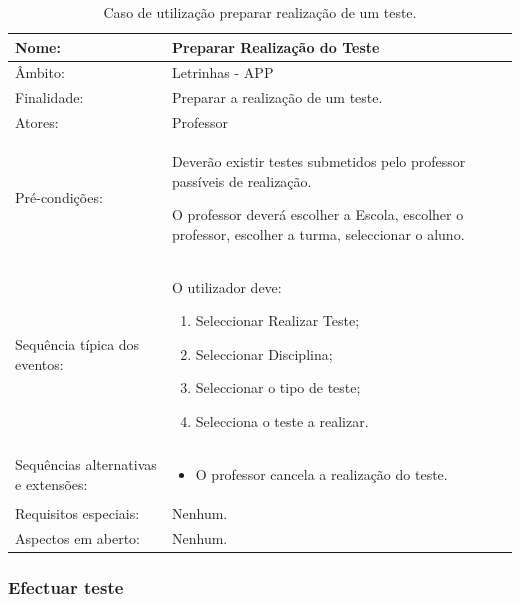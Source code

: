 \documentclass[a4paper]{article}
\begin{document}
					\begin{table}[h]
							\begin{tabular}{|p{2cm} p{10cm}|}
								\hline Nome: & Preparar Realização do Teste \\ 
								\hline Âmbito: & Letrinhas - APP \\ 
								\hline Finalidade: & Preparar a realização de um teste. \\ 
								\hline Atores: & Professor \\ 
							    \hline Pré-condições: & Deverão existir testes submetidos pelo  professor passíveis de realização.

								O professor deverá escolher a  Escola, escolher o professor, escolher a turma, seleccionar o aluno.
								 \\ 
							    \hline Sequência típica dos eventos: &  					
								O utilizador deve:
	    					\begin{enumerate}
							    \item	Seleccionar Realizar Teste;
								\item	Seleccionar Disciplina;
								\item	Seleccionar o tipo de teste;
								\item	Selecciona o teste a realizar.
						    \end{enumerate}  \\
								    \hline Sequências alternativas e extensões: & 
								    \begin{itemize}			    	
								  				    	\item O professor cancela a realização do teste.
								    \end{itemize}
								     \\ 
								    \hline Requisitos especiais: & Nenhum.\\ 
								    \hline Aspectos em aberto: & Nenhum. \\
													\hline 
							\end{tabular}
							\caption{Caso de utilização preparar realização de um teste.}
						\end{table} 
\newpage
					\subsubsection{Efectuar teste}
\end{document}
